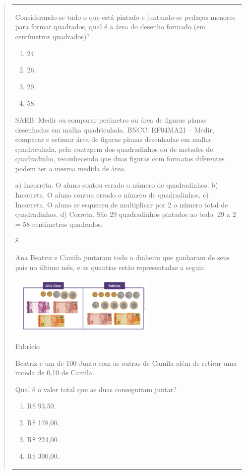 \begin{mdframed}[linewidth=2pt,linecolor=salmao,roundcorner=2pt]
\begin{itemize}
{\begin{itemize}
\begin{escolha}
{\begin{quote}
{\begin{escolha}
{{{{{\begin{longtable}[]{@{}l@{}}
\begin{itemize}
{Considerando-se tudo o que está pintado e juntando-se pedaços
menores para formar quadrados, qual é a área do desenho formado (em centímetros quadrados)?

\begin{enumerate}
\item
  24.
\item
  26.
\item
  29.
\item
  58.
\end{enumerate}

SAEB: Medir ou comparar perímetro ou área de figuras planas
desenhadas em malha quadriculada.
BNCC: EF04MA21 -- Medir, comparar e estimar área de figuras planas desenhadas em malha quadriculada,
pela contagem dos quadradinhos ou de metades de quadradinho, reconhecendo que duas figuras
com formatos diferentes podem ter a mesma medida de área.

a) Incorreta. O aluno contou errado o número de quadradinhos.
b) Incorreta. O aluno contou errado o número de quadradinhos.
c) Incorreta. O aluno se esqueceu de multiplicar por 2 o número total de quadradinhos.
d) Correta. São 29 quadradinhos pintados ao todo: 29 x 2 = 58 centímetros quadrados.

\num{8}

Ana Beatriz e Camila juntaram todo o dinheiro que ganharam de seus pais no
último mês, e as quantias estão representadas a seguir.


\includegraphics[width=2.77564in,height=1.11703in]{media/image145.png}

Fabrício

Beatriz e um de 100 Junto com as outras de Camila além de retirar uma
moeda de 0,10 de Camila.

Qual é o valor total que as duas conseguiram juntar?

\begin{enumerate}
\item
  R\$ 93,50.
\item
  R\$ 178,00.
\item
  R\$ 224,00.
\item
  R\$ 300,00.
\end{enumerate}

}
\end{itemize}
\end{longtable}}}}}}
\end{escolha}}
\end{quote}}
\end{escolha}
\end{itemize}}
\end{itemize}
\end{mdframed}
